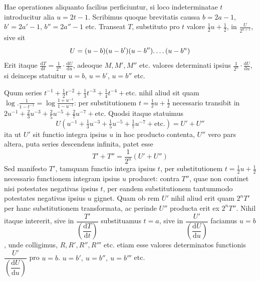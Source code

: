 Hae operationes aliquanto facilius perficiuntur, si loco indeterminatae $t$
introducitur alia $u=2t-1$. Scribimus quoque brevitatis caussa $b=2a-1$,
$b'=2a'-1$, $b''=2a''-1$ etc. Transeat $T$, substituto pro $t$ valore
$\tfrac12u+\tfrac12$, in $\frac{U}{2^{n+1}}$, sive sit
\[
U=(u-b)(u-b')(u-b'')\ldotp\ldotp\ldotp\ldotp(u-b^n)
\]
Erit itaque $\frac{\mathrm{d}T}{\mathrm{d}t}=\frac{1}{2^n}\cdot\frac{\mathrm{d}U}{\mathrm{d}u}$,
adeoque $M,M',M''$ etc. valores determinati ipsius
$\frac{1}{2^n}\cdot\frac{\mathrm{d}U}{\mathrm{d}u}$, si deinceps statuitur $u=b$, $u=b'$, $u=b''$ etc.

Quum series $t^{-1}+\tfrac12t^{-2}+\tfrac13t^{-3}+\tfrac14t^{-4}+\text{etc.}$ nihil aliud sit quam
$\log.\frac{1}{1-t^{-1}}=\log\frac{1+u^{-1}}{1-u^{-1}}$:
per substitutionem $t=\tfrac12u+\tfrac12$ necessario transibit in
$2u^{-1}+\tfrac23u^{-3}+\tfrac25u^{-5}+\tfrac27u^{-7}+\text{etc.}$ Quodsi itaque statuimus
\[
U(u^{-1}+\tfrac13u^{-3}+\tfrac15u^{-5}+\tfrac17u^{-7}+\text{etc.})=U'+U''
\]
ita ut $U'$ sit functio integra ipsius $u$ in hoc producto contenta, $U''$ vero pars
altera, puta series descendens infinita, patet esse
\[
T'+T''=\frac{1}{2^n}(U'+U'')
\]
Sed manifesto $T'$, tamquam functio integra ipsius $t$, per substitutionem
$t=\tfrac12u+\tfrac12$ necessario functionem integram ipsius $u$ producet: contra $T''$,
quae non continet nisi potestates negativas ipsius $t$, per eandem substitutionem
tantummodo potestates negativas ipsius $u$ gignet. Quam ob rem $U'$ nihil aliud erit quam $2^nT'$ per hanc substitutionem transformata, ac perinde $U''$ producta erit ex $2^nT''$. Nihil itaque intererit, sive in $\dfrac{T'}{\left(\dfrac{\mathrm{d}T}{\mathrm{d}t}\right)}$ substituamus $t=a$, sive in $\dfrac{U'}{\left(\dfrac{\mathrm{d}U}{\mathrm{d}u}\right)}$ faciamus $u=b$, unde colligimus, $R, R', R'', R'''$ etc. etiam esse valores determinatos functionis $\dfrac{U'}{\left(\dfrac{\mathrm{d}U}{\mathrm{d}u}\right)}$ pro $u=b$. $u=b',\ u=b'',\ u=b'''$ etc.

